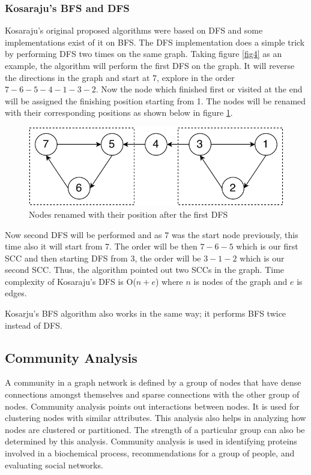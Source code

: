 \documentclass[journal,twoside,web]{ieeecolor}
\begin{document}
\subsubsection{Kosaraju's BFS and DFS}
Kosaraju's original proposed algorithms were based on DFS and some implementations exist of it on BFS. The DFS implementation does a simple trick by performing DFS two times on the same graph. Taking figure \ref{fig4} as an example, the algorithm will perform the first DFS on the graph. It will reverse the directions in the graph and start at $7$, explore in the order $7-6-5-4-1-3-2$. Now the node which finished first or visited at the end will be assigned the finishing position starting from 1. The nodes will be renamed with their corresponding positions as shown below in figure \ref{fig5}. 

\begin{figure}[!h]
    \centerline{\includegraphics[scale=0.75]{figures/scc2.pdf}}
    \caption{Nodes renamed with their position after the first DFS}
    \label{fig5}
\end{figure}

Now second DFS will be performed and as $7$ was the start node previously, this time also it will start from $7$. The order will be then $7-6-5$ which is our first SCC and then starting DFS from $3$, the order will be $3-1-2$ which is our second SCC. Thus, the algorithm pointed out two SCCs in the graph. Time complexity of Kosaraju’s DFS is O($n + e$) where $n$ is nodes of the graph and $e$ is edges.

Kosarju's BFS algorithm also works in the same way; it performs BFS twice instead of DFS.

\subsection{Community Analysis}
A community in a graph network is defined by a group of nodes that have dense connections amongst themselves and sparse connections with the other group of nodes. Community analysis points out interactions between nodes. It is used for clustering nodes with similar attributes. This analysis also helps in analyzing how nodes are clustered or partitioned. The strength of a particular group can also be determined by this analysis. Community analysis is used in identifying proteins involved in a biochemical process, recommendations for a group of people, and evaluating social networks. 
\end{document}
